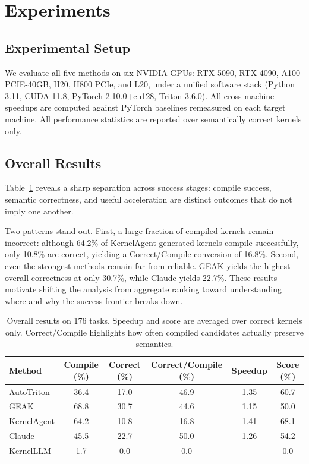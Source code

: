 \section{Experiments} 
\label{Sec:Experiments}

\subsection{Experimental Setup}

We evaluate all five methods on six NVIDIA GPUs: RTX 5090, RTX 4090, A100-PCIE-40GB, H20, H800 PCIe, and L20, under a unified software stack (Python 3.11, CUDA 11.8, PyTorch 2.10.0+cu128, Triton 3.6.0). 
All cross-machine speedups are computed against PyTorch baselines remeasured on each target machine. All performance statistics are reported over semantically correct kernels only.

\subsection{Overall Results}
\label{sec:overall_results}

Table~\ref{tab:overall-main} reveals a sharp separation across success stages: compile success, semantic correctness, and useful acceleration are distinct outcomes that do not imply one another.

Two patterns stand out.
First, a large fraction of compiled kernels remain incorrect: although 64.2\% of KernelAgent-generated kernels compile successfully, only 10.8\% are correct, yielding a Correct/Compile conversion of 16.8\%.
Second, even the strongest methods remain far from reliable. GEAK yields the highest overall correctness at only 30.7\%, while Claude yields 22.7\%.
These results motivate shifting the analysis from aggregate ranking toward understanding where and why the success frontier breaks down.

\begin{table}[t]
\centering
\small
\setlength{\tabcolsep}{7pt}
\caption{Overall results on 176 tasks. Speedup and score are averaged over correct kernels only. Correct/Compile highlights how often compiled candidates actually preserve semantics.}
\begin{tabular}{lccccc}
\toprule
Method & Compile (\%) & Correct (\%) & Correct/Compile (\%) & Speedup & Score (\%) \\
\midrule
AutoTriton  & 36.4 & 17.0 & 46.9 & 1.35 & 60.7 \\
GEAK        & 68.8 & 30.7 & 44.6 & 1.15 & 50.0 \\
KernelAgent & 64.2 & 10.8 & 16.8 & 1.41 & 68.1 \\
Claude      & 45.5 & 22.7 & 50.0 & 1.26 & 54.2 \\
KernelLLM   & 1.7  & 0.0  & 0.0  & --   & 0.0 \\
\bottomrule
\end{tabular}
\label{tab:overall-main}
\end{table}


